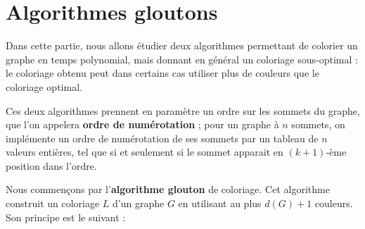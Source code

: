 \section{Algorithmes gloutons} 

Dans cette partie, nous allons étudier deux algorithmes permettant de colorier un graphe en temps polynomial, mais donnant en général un coloriage sous-optimal : le coloriage obtenu peut dans certains cas utiliser plus de couleurs que le coloriage optimal. 

Ces deux algorithmes prennent en paramètre un ordre sur les sommets du graphe, que l'on appelera {\bf ordre de numérotation} ; pour un graphe  à $n$ sommets, on implémente un ordre de numérotation de ses sommets par un tableau  de $n$ valeurs entières, tel que  si et seulement si le sommet  apparait en $(k+1)$-ème position dans l'ordre. 

Nous commençons par l'{\bf algorithme glouton} de coloriage. Cet algorithme construit un coloriage $L$ d'un graphe $G$ en utilisant au plus $d(G)+1$ couleurs. Son principe est le suivant :

